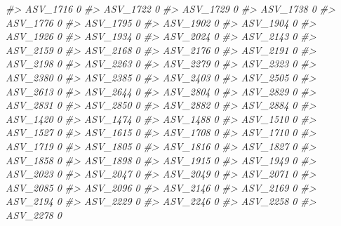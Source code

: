 \documentclass[
]{article}
\newenvironment{Shaded}{\begin{snugshade}}{\end{snugshade}}
\newcommand{\CommentTok}[1]{\textcolor[rgb]{0.56,0.35,0.01}{\textit{#1}}}
\begin{document}
\begin{Shaded}
\begin{Highlighting}[]
\CommentTok{\#\textgreater{} ASV\_1716  0}
\CommentTok{\#\textgreater{} ASV\_1722  0}
\CommentTok{\#\textgreater{} ASV\_1729  0}
\CommentTok{\#\textgreater{} ASV\_1738  0}
\CommentTok{\#\textgreater{} ASV\_1776  0}
\CommentTok{\#\textgreater{} ASV\_1795  0}
\CommentTok{\#\textgreater{} ASV\_1902  0}
\CommentTok{\#\textgreater{} ASV\_1904  0}
\CommentTok{\#\textgreater{} ASV\_1926  0}
\CommentTok{\#\textgreater{} ASV\_1934  0}
\CommentTok{\#\textgreater{} ASV\_2024  0}
\CommentTok{\#\textgreater{} ASV\_2143  0}
\CommentTok{\#\textgreater{} ASV\_2159  0}
\CommentTok{\#\textgreater{} ASV\_2168  0}
\CommentTok{\#\textgreater{} ASV\_2176  0}
\CommentTok{\#\textgreater{} ASV\_2191  0}
\CommentTok{\#\textgreater{} ASV\_2198  0}
\CommentTok{\#\textgreater{} ASV\_2263  0}
\CommentTok{\#\textgreater{} ASV\_2279  0}
\CommentTok{\#\textgreater{} ASV\_2323  0}
\CommentTok{\#\textgreater{} ASV\_2380  0}
\CommentTok{\#\textgreater{} ASV\_2385  0}
\CommentTok{\#\textgreater{} ASV\_2403  0}
\CommentTok{\#\textgreater{} ASV\_2505  0}
\CommentTok{\#\textgreater{} ASV\_2613  0}
\CommentTok{\#\textgreater{} ASV\_2644  0}
\CommentTok{\#\textgreater{} ASV\_2804  0}
\CommentTok{\#\textgreater{} ASV\_2829  0}
\CommentTok{\#\textgreater{} ASV\_2831  0}
\CommentTok{\#\textgreater{} ASV\_2850  0}
\CommentTok{\#\textgreater{} ASV\_2882  0}
\CommentTok{\#\textgreater{} ASV\_2884  0}
\CommentTok{\#\textgreater{} ASV\_1420  0}
\CommentTok{\#\textgreater{} ASV\_1474  0}
\CommentTok{\#\textgreater{} ASV\_1488  0}
\CommentTok{\#\textgreater{} ASV\_1510  0}
\CommentTok{\#\textgreater{} ASV\_1527  0}
\CommentTok{\#\textgreater{} ASV\_1615  0}
\CommentTok{\#\textgreater{} ASV\_1708  0}
\CommentTok{\#\textgreater{} ASV\_1710  0}
\CommentTok{\#\textgreater{} ASV\_1719  0}
\CommentTok{\#\textgreater{} ASV\_1805  0}
\CommentTok{\#\textgreater{} ASV\_1816  0}
\CommentTok{\#\textgreater{} ASV\_1827  0}
\CommentTok{\#\textgreater{} ASV\_1858  0}
\CommentTok{\#\textgreater{} ASV\_1898  0}
\CommentTok{\#\textgreater{} ASV\_1915  0}
\CommentTok{\#\textgreater{} ASV\_1949  0}
\CommentTok{\#\textgreater{} ASV\_2023  0}
\CommentTok{\#\textgreater{} ASV\_2047  0}
\CommentTok{\#\textgreater{} ASV\_2049  0}
\CommentTok{\#\textgreater{} ASV\_2071  0}
\CommentTok{\#\textgreater{} ASV\_2085  0}
\CommentTok{\#\textgreater{} ASV\_2096  0}
\CommentTok{\#\textgreater{} ASV\_2146  0}
\CommentTok{\#\textgreater{} ASV\_2169  0}
\CommentTok{\#\textgreater{} ASV\_2194  0}
\CommentTok{\#\textgreater{} ASV\_2229  0}
\CommentTok{\#\textgreater{} ASV\_2246  0}
\CommentTok{\#\textgreater{} ASV\_2258  0}
\CommentTok{\#\textgreater{} ASV\_2278  0}

\end{Highlighting}
\end{Shaded}
\end{document}
